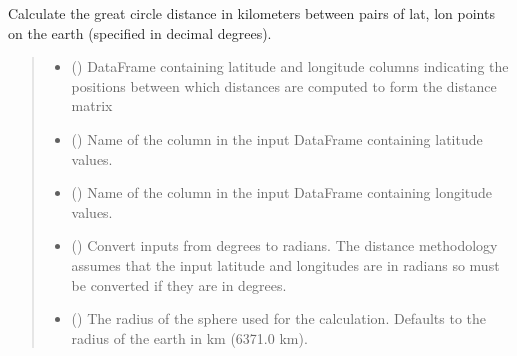 \documentclass[letterpaper,10pt,english]{sphinxmanual}
\begin{document}
\begin{fulllineitems}
\label{\detokenize{misc:glomar_gridding.distances.haversine_distance_from_frame}}
\pysigstartsignatures
\pysiglinewithargsret
{}
{\sphinxparamcomma {}\sphinxparamcomma {}\sphinxparamcomma {}\sphinxparamcomma {}}
{}
\pysigstopsignatures
\sphinxAtStartPar
Calculate the great circle distance in kilometers between pairs of lat, lon
points on the earth (specified in decimal degrees).
\begin{quote}\begin{description}
\begin{itemize}
\item {}
\sphinxAtStartPar
{} () \textendash{} DataFrame containing latitude and longitude columns indicating the
positions between which distances are computed to form the distance
matrix

\item {}
\sphinxAtStartPar
{} () \textendash{} Name of the column in the input DataFrame containing latitude values.

\item {}
\sphinxAtStartPar
{} () \textendash{} Name of the column in the input DataFrame containing longitude values.

\item {}
\sphinxAtStartPar
{} () \textendash{} Convert inputs from degrees to radians. The distance methodology assumes
that the input latitude and longitudes are in radians so must be
converted if they are in degrees.

\item {}
\sphinxAtStartPar
{} () \textendash{} The radius of the sphere used for the calculation. Defaults to the
radius of the earth in km (6371.0 km).


\end{itemize}
\end{description}
\end{quote}
\end{fulllineitems}
\end{document}
